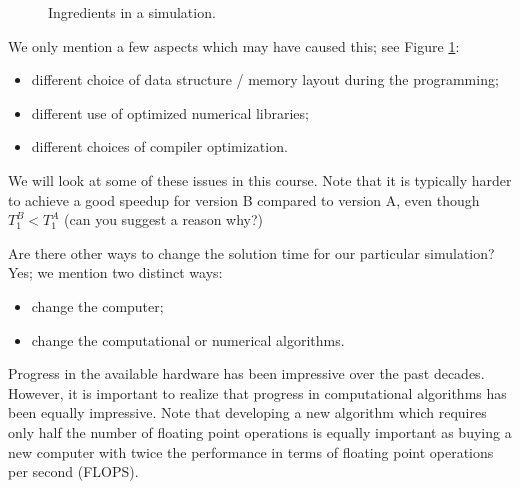 \begin{figure}
  \centering
  \caption{Ingredients in a simulation.}
  \label{fig:single}
\end{figure}

We only mention a few aspects which may have caused this; see Figure \ref{fig:single}:
\begin{itemize}
\item different choice of data structure / memory layout during the programming;
\item different use of optimized numerical libraries;
\item different choices of compiler optimization.
\end{itemize}
We will look at some of these issues in this course.
Note that it is typically harder to achieve a good speedup for version B compared to
version A, even though $T_1^B  < T_1^A$ (can you suggest a reason why?)

Are there other ways to change the solution time for our particular simulation?
Yes; we mention two distinct ways:
\begin{itemize}
\item change the computer;
\item change the computational or numerical algorithms.
\end{itemize}
Progress in the available hardware has been impressive over the past decades.
However, it is important to realize that progress in computational algorithms
has been equally impressive. Note that developing a new algorithm which requires
only half the number of floating point operations is equally important as buying
a new computer with twice the performance in terms of floating point operations
per second (FLOPS).

